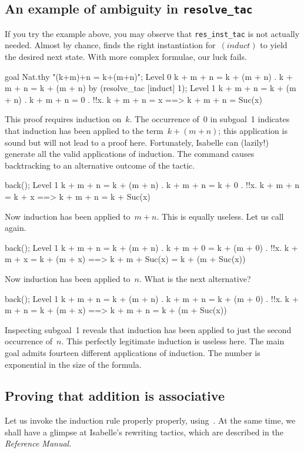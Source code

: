 \subsection{An example of ambiguity in {\tt resolve_tac}}
If you try the example above, you may observe that {\tt res_inst_tac} is
not actually needed.  Almost by chance,  finds the right
instantiation for~$(induct)$ to yield the desired next state.  With more
complex formulae, our luck fails.  
\begin{ttbox}
goal Nat.thy "(k+m)+n = k+(m+n)";
{\out Level 0}
{\out k + m + n = k + (m + n)}
{. k + m + n = k + (m + n)}
\ttbreak
by (resolve_tac [induct] 1);
{\out Level 1}
{\out k + m + n = k + (m + n)}
{. k + m + n = 0}
{. !!x. k + m + n = x ==> k + m + n = Suc(x)}
\end{ttbox}
This proof requires induction on~$k$.  The occurrence of~0 in subgoal~1
indicates that induction has been applied to the term~$k+(m+n)$; this
application is sound but will not lead to a proof here.  Fortunately,
Isabelle can (lazily!) generate all the valid applications of induction.
The  command causes backtracking to an alternative outcome of
the tactic.
\begin{ttbox}
back();
{\out Level 1}
{\out k + m + n = k + (m + n)}
{. k + m + n = k + 0}
{. !!x. k + m + n = k + x ==> k + m + n = k + Suc(x)}
\end{ttbox}
Now induction has been applied to~$m+n$.  This is equally useless.  Let us
call  again.
\begin{ttbox}
back();
{\out Level 1}
{\out k + m + n = k + (m + n)}
{. k + m + 0 = k + (m + 0)}
{. !!x. k + m + x = k + (m + x) ==>}
{\out          k + m + Suc(x) = k + (m + Suc(x))}
\end{ttbox}
Now induction has been applied to~$n$.  What is the next alternative?
\begin{ttbox}
back();
{\out Level 1}
{\out k + m + n = k + (m + n)}
{. k + m + n = k + (m + 0)}
{. !!x. k + m + n = k + (m + x) ==> k + m + n = k + (m + Suc(x))}
\end{ttbox}
Inspecting subgoal~1 reveals that induction has been applied to just the
second occurrence of~$n$.  This perfectly legitimate induction is useless
here.  The main goal admits fourteen different applications of induction.
The number is exponential in the size of the formula.

\subsection{Proving that addition is associative}
Let us invoke the induction rule properly properly,
using~.  At the same time, we shall have a glimpse at
Isabelle's rewriting tactics, which are described in the {\em Reference
  Manual}.

